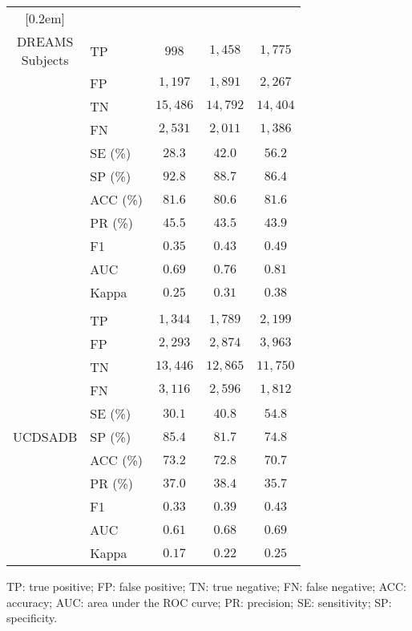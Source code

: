 \documentclass[10pt,a4paper,english]{amsart}
\begin{document}
\begin{table}
\begin{center}
\begin{small}
\begin{tabular}{c|lccc}
[0.2em]
\hline\\ [-0.6em] \multirowcell{11}{DREAMS\\Subjects}
&TP   & $998$ & $1,458$  & $1,775$ \\
&FP  & $1,197$ & $1,891$  & $2,267$ \\
&TN   & $15,486$ & $14,792$  & $14,404$\\
&FN  & $2,531$ & $2,011$  & $1,386$\\[0.6em]
&SE (\%) & $28.3$ & $42.0$  &  $56.2$\\
&SP (\%) & $92.8$ & $88.7$ &  $86.4$\\
&ACC (\%)   & $81.6$ & $80.6$  &  $81.6$ \\[0.6em]
&PR (\%) & $45.5$ & $43.5$  &  $43.9$\\
&F1   & $0.35$ & $0.43$  &  $0.49$\\
&AUC        & $0.69$ & $0.76$  &  $0.81$\\
&Kappa      & $0.25$ & $0.31$  &  $0.38$ \\
[0.2em]
\hline\\ [-0.6em] \multirow{11}{*}{UCDSADB}
&TP  & $1,344$ & $1,789$    & $2,199$ \\
&FP  & $2,293$ & $2,874$   & $3,963$ \\
&TN   & $13,446$ & $12,865$     & $11,750$\\
&FN  & $3,116$ & $2,596$  & $1,812$\\[0.6em]
&SE (\%) & $30.1$ & $40.8$ &  $54.8$\\
&SP (\%) & $85.4$ & $81.7$ &  $74.8$\\
&ACC (\%)   & $73.2$ & $72.8$ &  $70.7$ \\[0.6em]
&PR (\%)  & $37.0$ & $38.4$ &  $35.7$\\
&F1   & $0.33$ & $0.39$ &  $0.43$\\
&AUC        & $0.61$ & $0.68$ &  $0.69$\\
&Kappa      & $0.17$ & $0.22$ &  $0.25$ \\
[0.2em]
\hline
\end{tabular}
\end{small}
\end{center}
\vspace{0.1in}
\begin{footnotesize}
TP: true positive; FP: false positive; TN: true negative; FN: false negative; ACC: accuracy; AUC: area under the ROC curve; PR: precision; SE: sensitivity; SP: specificity.
\end{footnotesize}
\vskip -0.1in
\end{table}
\end{document}

